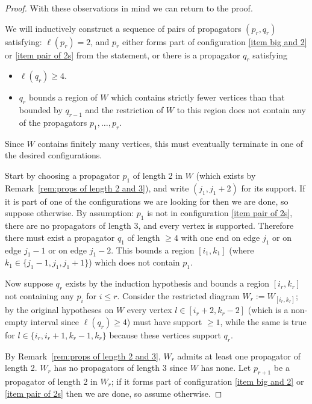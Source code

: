 \documentclass[11pt]{article}
\theoremstyle{remark}
\theoremstyle{definition}
\begin{document}
\begin{proof}
With these observations in mind we can return to the proof.
  
We will inductively construct a sequence of pairs of propagators $(p_r,q_r)$ satisfying: $\ell(p_r) = 2$, and $p_r$ either forms part of configuration \ref{item big and 2} or \ref{item pair of 2s} from the statement,
or there is a propagator $q_r$ satisfying
\begin{itemize}
\item $\ell(q_r) \geq 4$.
\item $q_r$ bounds a region of $W$ which contains strictly fewer vertices than that bounded by $q_{r-1}$ and the restriction of $W$ to this region does not contain any of the propagators $p_1, \dots, p_r$.
\end{itemize}
Since $W$ contains finitely many vertices, this must eventually terminate in one of the desired configurations. %

Start by choosing a propagator $p_1$ of length 2 in $W$ (which exists by Remark~\ref{rem:props of length 2 and 3}), and write $(j_1,j_1+2)$ for its support.  If it is part of one of the configurations we are looking for then we are done, 
so suppose otherwise. 
By assumption: $p_1$ is not in configuration \ref{item pair of 2s}, there are no propagators of length $3$, and every vertex is supported.  Therefore there must exist a propagator $q_1$ of length $\geq 4$ with one end on edge $j_1$ or on edge $j_1-1$ or on edge $j_1-2$.  This bounds a region $[i_1,k_1]$ (where $k_1 \in \{j_1-1, j_1, j_1+1\}$) which does not contain $p_1$.

Now suppose $q_{r}$ exists by the induction hypothesis and bounds a region $[i_r,k_r]$ not containing any $p_i$ for $i\leq r$.  Consider the restricted diagram $W_r:=W_{[i_r,k_r]}$; by the original hypotheses on $W$ every vertex $l \in [i_r+2,k_r-2]$ (which is a non-empty interval since $\ell(q_r) \geq 4$) must have support $\geq 1$, while the same is true for $l \in \{i_r,i_r+1,k_r-1,k_r\}$ because these vertices support $q_r$.  

By Remark~\ref{rem:props of length 2 and 3}, $W_r$ admits at least one propagator of length 2.  $W_r$ has no propagators of length $3$ since $W$ has none.  Let $p_{r+1}$ be a propagator of length 2 in $W_r$; if it forms part of configuration \ref{item big and 2} or \ref{item pair of 2s}
then we are done, so assume otherwise.


\end{proof}
\end{document}
